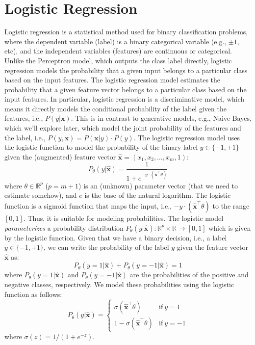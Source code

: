\documentclass{article}[11pt]
\def\R{\mathbb{R}}
\begin{document}
\section{Logistic Regression}
Logistic regression is a statistical method used for binary classification problems, where the dependent variable (label) is a binary categorical variable (e.g., $\pm{1}$, etc), 
and the independent variables (features) are continuous or categorical. Unlike the Perceptron model, which outputs the class label directly, logistic regression models the probability that a given input belongs to a particular class based on the input features.
The logistic regression model estimates the probability that a given feature vector belongs to a particular class based on the input features.
In particular, logistic regression is a discriminative model, which means it directly models the conditional probability of the label given the features, i.e., $P(y|\mathbf{x})$.
This is in contrast to generative models, e.g., Naive Bayes, which we'll explore later, which model the joint probability of the features and the label, i.e., $P(y,\mathbf{x}) = P(\mathbf{x}|y)\cdot{P(y)}$.
The logistic regression model uses the logistic function to model the probability of the binary label $y\in\{-1,+1\}$ given the (augmented) feature vector $\hat{\mathbf{x}} = \left(x_{1},x_{2},\dots,x_{m},1\right)$:
\begin{equation}\label{eq:logistic}
P_{\theta}(y|\hat{\mathbf{x}}) = \frac{1}{1 + e^{-y\cdot\left(\hat{\mathbf{x}}^{\top}\theta\right)}}
\end{equation}
where $\theta\in\R^{p}$ ($p = m+1$) is an (unknown) parameter vector (that we need to estimate somehow), and $e$ is the base of the natural logarithm.
The logistic function is a sigmoid function that maps the input, i.e., $-y\cdot\left(\hat{\mathbf{x}}^{\top}\theta\right)$ to the range $[0,1]$. Thus, it is suitable for modeling probabilities.
The logistic model \textit{parameterizes} a probability distribution $P_{\theta}(y|\hat{\mathbf{x}}) : \mathbb{R}^{p} \times \mathbb{R} \to [0,1]$ which is given by the logistic function.
Given that we have a binary decision, i.e., a label $y\in\{-1,+1\}$, we can write the probability of the label $y$ given the feature vector $\hat{\mathbf{x}}$ as:
\begin{equation}
    P_{\theta}(y = 1|\hat{\mathbf{x}}) + P_{\theta}(y = -1|\hat{\mathbf{x}}) = 1
\end{equation}
where $P_{\theta}(y = 1|\hat{\mathbf{x}})$ and $P_{\theta}(y = -1|\hat{\mathbf{x}})$ are the probabilities of the positive and negative classes, respectively. 
We model these probabilities using the logistic function as follows:
\begin{equation}
    P_{\theta}(y|\hat{\mathbf{x}}) = \begin{cases}
    \sigma(\hat{\mathbf{x}}^{\top}\theta) & \text{if}~y = 1\\
    1-\sigma(\hat{\mathbf{x}}^{\top}\theta) & \text{if}~y = -1
    \end{cases}
\end{equation}
where $\sigma(z) = 1/(1+e^{-z})$. 
\end{document}

